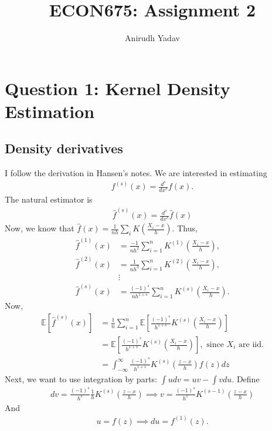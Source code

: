 \documentclass[12pt]{article}
\title{ECON675: Assignment 2}
\author{Anirudh Yadav}
\newcommand{\E}{\mathbb{E}}
\begin{document}
\maketitle


\section{Question 1: Kernel Density Estimation}

\subsection{Density derivatives}
I follow the derivation in Hansen's notes. We are interested in estimating
\begin{align*}
f^{(s)}(x) = \frac{d^s}{dx^s}f(x).
\end{align*}
The natural estimator is
\begin{align*}
\hat f^{(s)}(x)= \frac{d^s}{dx^s}\hat f(x)
\end{align*}
Now, we know that $\hat f(x) = \frac{1}{nh}\sum_i K\left(\frac{X_i - x}{h}\right)$. Thus,
\begin{align*}
\hat f^{(1)}(x) &= \frac{-1}{nh^2}\sum_{i=1}^n K^{(1)}\left(\frac{X_i - x}{h}\right),\\
\hat f^{(2)}(x) &= \frac{1}{nh^3}\sum_{i=1}^n K^{(2)}\left(\frac{X_i - x}{h}\right),\\
&\vdots \\
\hat f^{(s)}(x) &= \frac{(-1)^s}{nh^{1+s}}\sum_{i=1}^n K^{(s)}\left(\frac{X_i - x}{h}\right).
\end{align*}
Now,
\begin{align*}
\E[\hat f^{(s)}(x)] &= \frac{1}{n} \sum_{i=1}^n \E\left[ \frac{(-1)^s}{h^{1+s}}K^{(s)}\left(\frac{X_i - x}{h}\right)\right]\\
&=\E\left[ \frac{(-1)^s}{h^{1+s}}K^{(s)}\left(\frac{X_i - x}{h}\right)\right], \text{ since $X_i$ are iid}.\\
&=\int_{-\infty}^{\infty} \frac{(-1)^s}{h^{1+s}}K^{(s)}\left(\frac{z - x}{h}\right)f(z)dz
\end{align*}
Next, we want to use integration by parts: $\int u dv = uv - \int vdu$. Define
\begin{align*}
dv = \frac{(-1)^s}{h^{s}}\frac{1}{h}K^{(s)}\left(\frac{z - x}{h}\right) \implies v = \frac{(-1)^s}{h^{s}}K^{(s-1)}\left(\frac{z - x}{h}\right)
\end{align*}
And
\begin{align*}
u = f(z) \implies du = f^{(1)}(z).
\end{align*}
\end{document}
